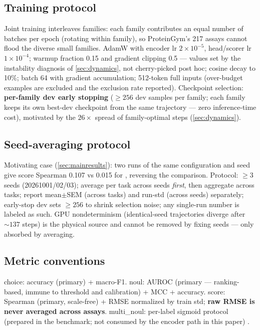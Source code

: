 \subsection{Training protocol}
\label{sec:trainproto}

Joint training interleaves families: each family contributes an equal number of batches
per epoch (rotating within family), so ProteinGym's 217 assays cannot flood the diverse
small families. AdamW with encoder lr $2{\times}10^{-5}$, head/scorer lr
$1{\times}10^{-4}$; warmup fraction 0.15 and gradient clipping 0.5 --- values set by the
instability diagnosis of \cref{sec:dynamics}, not cherry-picked post hoc; cosine decay to
10\%; batch 64 with gradient accumulation; 512-token full inputs (over-budget examples are
excluded and the exclusion rate reported). Checkpoint selection: \textbf{per-family dev
early stopping} ($\ge256$ dev samples per family; each family keeps its own best-dev
checkpoint from the same trajectory --- zero inference-time cost), motivated by the
$26\times$ spread of family-optimal steps (\cref{sec:dynamics}).

\subsection{Seed-averaging protocol}
\label{sec:seedavg}

Motivating case (\cref{sec:mainresults}): two runs of the same configuration and seed give
score Spearman 0.107 vs 0.015 for , reversing the comparison. Protocol:
$\ge3$ seeds (20261001/02/03); average per task across seeds \emph{first}, then aggregate
across tasks; report mean$\pm$SEM (across tasks) and run-std (across seeds) separately;
early-stop dev sets $\ge256$ to shrink selection noise; any single-run number is labeled as
such. GPU nondeterminism (identical-seed trajectories diverge after ${\sim}137$ steps) is
the physical source and cannot be removed by fixing seeds --- only absorbed by averaging.

\subsection{Metric conventions}
\label{sec:metrics}

choice: accuracy (primary) + macro-F1. noul: AUROC (primary --- ranking-based, immune to
threshold and calibration) + MCC + accuracy. score: Spearman (primary, scale-free) + RMSE
normalized by train std; \textbf{raw RMSE is never averaged across assays}. multi\_noul:
per-label sigmoid protocol (prepared in the benchmark; not consumed by the encoder path in
this paper) \citep[calibration protocol follows][]{guo2017calibration}.
